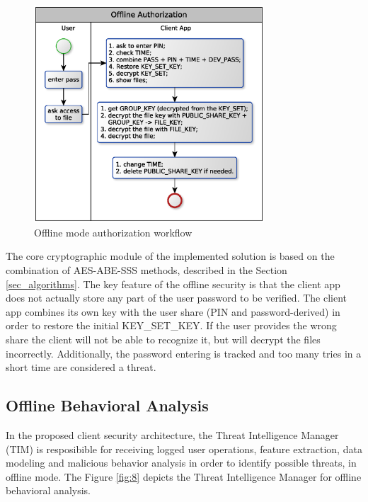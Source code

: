 \documentclass[twocolumn]{svjour3}          	%
\begin{document}
\begin{figure}[h!]
	\centering
	\includegraphics[width=8.6cm]{figures/offlineauthorizationworkflow.eps}
	\caption{Offline mode authorization workflow}
	\label{fig:7}
\end{figure}

The core cryptographic module of the implemented solution is based on the combination of AES-ABE-SSS methods, described in the Section \ref{sec_algorithms}. The key feature of the offline security is that the client app does not actually store any part of the user password to be verified. The client app combines its own key with the user share (PIN and password-derived) in order to restore the initial KEY\_SET\_KEY. If the user provides the wrong share the client will not be able to recognize it, but will decrypt the files incorrectly. Additionally, the password entering is tracked and too many tries in a short time are considered a threat.

\subsection{Offline Behavioral Analysis}
\label{sec_offline_behavioral_analysis}

In the proposed client security architecture, the Threat Intelligence Manager (TIM) is resposibible for receiving logged user operations, feature extraction, data modeling and malicious behavior analysis in order to identify possible threats, in offline mode. The Figure \ref{fig:8} depicts the Threat Intelligence Manager for offline behavioral analysis. 
\end{document}
